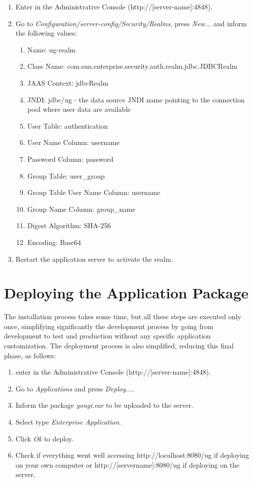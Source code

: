 \documentclass[envcountsame,envcountchap]{svmono}
\begin{document}
\begin{enumerate}
\item Enter in the Administrative Console (http://[server-name]:4848).
\item Go to \textit{Configuration/server-config/Security/Realms}, press \textit{New...} and inform the following values:
   \begin{enumerate}
   \item Name: ug-realm
   \item Class Name: com.sun.enterprise.security.auth.realm.jdbc.JDBCRealm
   \item JAAS Context: jdbcRealm
   \item JNDI: jdbc/ug - the data source JNDI name pointing to the connection pool where user data are available
   \item User Table: authentication
   \item User Name Column: username
   \item Password Column: password
   \item Group Table: user\_group
   \item Group Table User Name Column: username
   \item Group Name Column: group\_name
   \item Digest Algorithm: SHA-256
   \item Encoding: Base64
   \end{enumerate}
\item Restart the application server to activate the realm.
\end{enumerate}

\section{Deploying the Application Package}

The installation process takes some time, but all these steps are executed only once, simplifying significantly the development process by going from development to test and production without any specific application customization. The deployment process is also simplified, reducing this final phase, as follows:

\begin{enumerate}
\item enter in the Administrative Console (http://[server-name]:4848).
\item Go to \textit{Applications} and press \textit{Deploy...}.
\item Inform the package \textit{yougi.ear} to be uploaded to the server.
\item Select type \textit{Enterprise Application}.
\item Click \textit{Ok} to deploy.
\item Check if everything went well accessing http://localhost:8080/ug if deploying on your own computer or http://[servername]:8080/ug if deploying on the server.
\end{enumerate}
\end{document}
